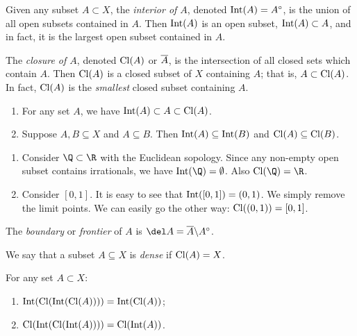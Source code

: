 \begin{definition}
	Given any subset $A \subset X$, the \emph{interior of $A$}, denoted $\operatorname{Int}(A) = A^\circ$, is the union of all open subsets contained in $A$.
	Then $\operatorname{Int}(A)$ is an open subset, $\operatorname{Int}(A) \subset A$, and in fact, it is the largest open subset contained in $A$. %

	The \emph{closure of $A$}, denoted $\operatorname{Cl}(A)$ or $\overline{A}$, is the intersection of all closed sets which contain $A$.
	Then $\operatorname{Cl}(A)$ is a closed subset of $X$ containing $A$; that is, $A \subset \operatorname{Cl}(A)$. In fact, $\operatorname{Cl}(A)$ is the \emph{smallest} closed subset containing $A$. %
\end{definition}

\begin{remarks}
\mbox{}
\begin{enumerate}
	\shortskip
	\item For any set $A$, we have $\operatorname{Int}(A) \subset A \subset \operatorname{Cl}(A)$.
	\item Suppose $A,B \subseteq X$ and $A\subseteq B$. Then $\operatorname{Int}(A) \subseteq \operatorname{Int}(B)$ and $\operatorname{Cl}(A) \subseteq \operatorname{Cl}(B)$.
\end{enumerate}
\end{remarks}

\begin{examples}
	\mbox{}
	\begin{enumerate}
		\shortskip
		\item Consider $\Q\subset\R$ with the Euclidean sopology. Since any non-empty open subset contains irrationals, we have $\Int(\Q) = \emptyset$. Also $\Cl(\Q)=\R$.
		\item Consider $[0,1]$. It is easy to see that $\operatorname{Int}([0,1]) = (0,1)$. We simply remove the limit points.
		We can easily go the other way: $\operatorname{Cl}((0,1)) = [0,1]$.
	\end{enumerate}
\end{examples}

\begin{definition}
	The \emph{boundary} or \emph{frontier} of $A$ is $\boundary{A} = \Abar\backslash A^\circ$.

	We say that a subset $A\subseteq X$ is \emph{dense} if $\operatorname{Cl}(A) = X$.
\end{definition}

\begin{proposition}
	For any set $A\subset X$:
	\begin{enumerate}
		\shortskip
		\item $\operatorname{Int}(\operatorname{Cl}(\operatorname{Int}(\operatorname{Cl}(A)))) = \operatorname{Int}(\operatorname{Cl}(A))$;
		\item $\operatorname{Cl}(\operatorname{Int}(\operatorname{Cl}(\operatorname{Int}(A)))) = \operatorname{Cl}(\operatorname{Int}(A))$.
	\end{enumerate}
\end{proposition}

